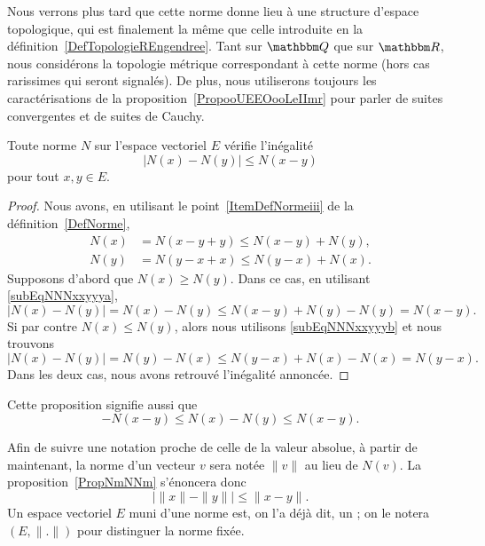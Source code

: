 \begin{normaltext}      \label{ooLCMFooQjMaxV}
    Nous verrons plus tard que cette norme donne lieu à une structure d'espace topologique, qui est finalement la même que celle introduite en la définition~\ref{DefTopologieREngendree}. Tant sur \( \eQ\) que sur \( \eR\), nous considérons la topologie métrique correspondant à cette norme (hors cas rarissimes qui seront signalés). De plus, nous utiliserons toujours les caractérisations de la proposition~\ref{PropooUEEOooLeIImr} pour parler de suites convergentes et de suites de Cauchy.
\end{normaltext}

\begin{proposition}		\label{PropNmNNm}
	Toute norme $N$ sur l'espace vectoriel $E$ vérifie l'inégalité
	\begin{equation}
		\big| N(x)-N(y) \big|\leq N(x-y)
	\end{equation}
	pour tout $x,y\in E$.
\end{proposition}

\begin{proof}
	Nous avons, en utilisant le point~\ref{ItemDefNormeiii} de la définition~\ref{DefNorme},
	\begin{subequations}
		\begin{align}
			N(x)&=N(x-y+y)\leq N(x-y)+N(y),	\label{subEqNNNxxyyya}\\
			N(y)&=N(y-x+x)\leq N(y-x)+N(x).	\label{subEqNNNxxyyyb}
		\end{align}
	\end{subequations}
	Supposons d'abord que $N(x)\geq N(y)$. Dans ce cas, en utilisant \eqref{subEqNNNxxyyya},
	\begin{equation}
		\big| N(x)-N(y) \big|=N(x)-N(y)\leq N(x-y)+N(y)-N(y)=N(x-y).
	\end{equation}
	Si par contre $N(x)\leq N(y)$, alors nous utilisons \eqref{subEqNNNxxyyyb} et nous trouvons
	\begin{equation}
		\big| N(x)-N(y) \big|=N(y)-N(x)\leq N(y-x)+N(x)-N(x)=N(y-x).
	\end{equation}
	Dans les deux cas, nous avons retrouvé l'inégalité annoncée.
\end{proof}
Cette proposition signifie aussi que
\begin{equation}	\label{EqNleqNNleqNvqlqbs}
	-N(x-y)\leq N(x)-N(y)\leq N(x-y).
\end{equation}

\begin{normaltext}	
Afin de suivre une notation proche de celle de la valeur absolue, à partir de maintenant, la norme d'un vecteur $v$ sera notée $\| v\|$ au lieu de $N(v)$. La proposition~\ref{PropNmNNm} s'énoncera donc
\begin{equation}
\big| \| x \|-\| y \| \big|\leq \| x-y \|.
\end{equation}
Un espace vectoriel $E$ muni d'une norme est, on l'a déjà dit, un ; on le notera $(E,\| . \|)$ pour distinguer la norme fixée.
\end{normaltext}


